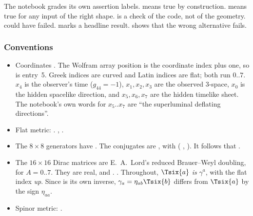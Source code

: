 The notebook grades its own assertion labels. \cfcode{[definition]} means true by construction.
\cfcode{[structural]} means true for any input of the right shape.  is a
check of the code, not of the geometry.  could have failed.
 marks a headline result. \cfcode{[control]} shows that the wrong alternative
fails.

\subsubsection{Conventions}
\label{csc:conventions}\label{sec:3.8.2}

\begin{itemize}
  \item Coordinates . The Wolfram array position is the coordinate
    index plus one, so  is entry~5. Greek indices are curved and Latin indices are flat;
    both run $0..7$. $x_4$ is the observer's time ($g_{44}=-1$), $x_1,x_2,x_3$ are the observed
    3-space, $x_0$ is the hidden spacelike direction, and $x_5,x_6,x_7$ are the hidden timelike
    sheet. The notebook's own words for $x_5..x_7$ are ``the superluminal deflating directions''.
  \item Flat metric: . 
    , .
  \item The $8\times8$ generators have . The conjugates are
    , with
     ( ,
    ). It follows that .
  \item The $16\times16$ Dirac matrices are E.~A.~Lord's reduced Brauer--Weyl doubling,
     for $A=0..7$. They are real, and
    . 
    . Throughout, $\Tsix{a}$ \emph{is}
    $\gamma^a$, with the flat index \emph{up}. Since  is its own inverse,
    $\gamma_a=\eta_{ab}\Tsix{b}$ differs from $\Tsix{a}$ by the sign $\eta_{aa}$.
  \item Spinor metric: . 

\end{itemize}
